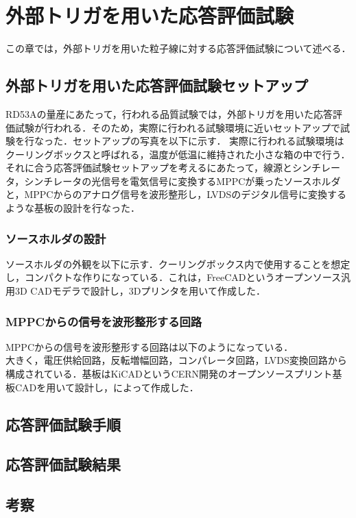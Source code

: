 \chapter{外部トリガを用いた応答評価試験}
この章では，外部トリガを用いた粒子線に対する応答評価試験について述べる．

\section{外部トリガを用いた応答評価試験セットアップ}
RD53Aの量産にあたって，行われる品質試験では，外部トリガを用いた応答評価試験が行われる．そのため，実際に行われる試験環境に近いセットアップで試験を行なった．セットアップの写真を以下に示す．
実際に行われる試験環境はクーリングボックスと呼ばれる，温度が低温に維持された小さな箱の中で行う．それに合う応答評価試験セットアップを考えるにあたって，線源とシンチレータ，シンチレータの光信号を電気信号に変換するMPPCが乗ったソースホルダと，MPPCからのアナログ信号を波形整形し，LVDSのデジタル信号に変換するような基板の設計を行なった．

\subsection{ソースホルダの設計}
ソースホルダの外観を以下に示す．クーリングボックス内で使用することを想定し，コンパクトな作りになっている．これは，FreeCADというオープンソース汎用3D CADモデラで設計し，3Dプリンタを用いて作成した．

\subsection{MPPCからの信号を波形整形する回路}
MPPCからの信号を波形整形する回路は以下のようになっている．\\
大きく，電圧供給回路，反転増幅回路，コンパレータ回路，LVDS変換回路から構成されている．基板はKiCADというCERN開発のオープンソースプリント基板CADを用いて設計し，によって作成した．

\section{応答評価試験手順}
\section{応答評価試験結果}
\section{考察}
